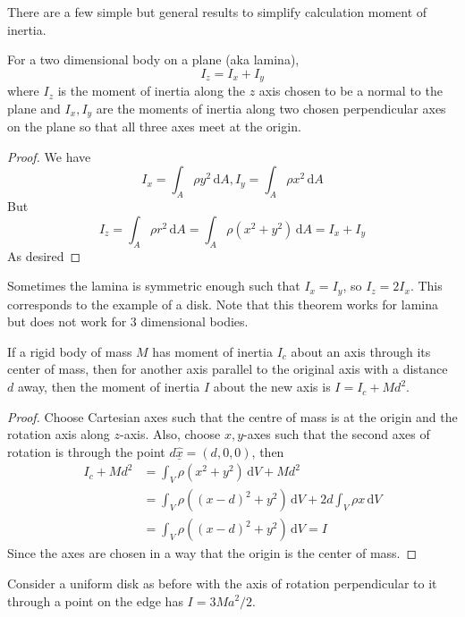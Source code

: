 There are a few simple but general results to simplify calculation moment of inertia.
\begin{theorem}
    For a two dimensional body on a plane (aka lamina),
    $$I_z=I_x+I_y$$
    where $I_z$ is the moment of inertia along the $z$ axis chosen to be a normal to the plane and $I_x,I_y$ are the moments of inertia along two chosen perpendicular axes on the plane so that all three axes meet at the origin.
\end{theorem}
\begin{proof}
    We have
    $$I_x=\int_A\rho y^2\,\mathrm dA,I_y=\int_A\rho x^2\,\mathrm dA$$
    But
    $$I_z=\int_A\rho r^2\,\mathrm dA=\int_A\rho(x^2+y^2)\,\mathrm dA=I_x+I_y$$
    As desired
\end{proof}
Sometimes the lamina is symmetric enough such that $I_x=I_y$, so $I_z=2I_x$.
This corresponds to the example of a disk.
Note that this theorem works for lamina but does not work for $3$ dimensional bodies.
\begin{theorem}
    If a rigid body of mass $M$ has moment of inertia $I_c$ about an axis through its center of mass, then for another axis parallel to the original axis with a distance $d$ away, then the moment of inertia $I$ about the new axis is $I=I_c+Md^2$.
\end{theorem}
\begin{proof}
    Choose Cartesian axes such that the centre of mass is at the origin and the rotation axis along $z$-axis.
    Also, choose $x,y$-axes such that the second axes of rotation is through the point $d\underline{\hat{x}}=(d,0,0)$, then
    \begin{align*}
        I_c+Md^2&=\int_V\rho(x^2+y^2)\,\mathrm dV+Md^2\\
        &=\int_V\rho((x-d)^2+y^2)\,\mathrm dV+2d\int_V\rho x\,\mathrm dV\\
        &=\int_V\rho((x-d)^2+y^2)\,\mathrm dV=I
    \end{align*}
    Since the axes are chosen in a way that the origin is the center of mass.
\end{proof}
\begin{example}
    Consider a uniform disk as before with the axis of rotation perpendicular to it through a point on the edge has $I=3Ma^2/2$.
\end{example}
